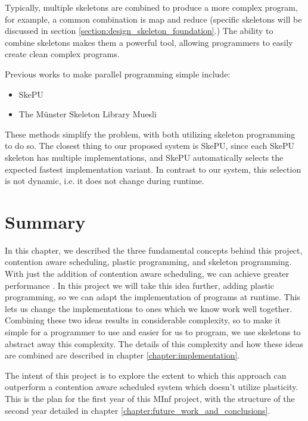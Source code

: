 Typically, multiple skeletons are combined to produce a more complex program, for example, a common combination is map and reduce (specific skeletons will be discussed in section \ref{section:design_skeleton_foundation}.) The ability to combine skeletons makes them a powerful tool, allowing programmers to easily create clean complex programs.

Previous works to make parallel programming simple include:

\begin{itemize}
	\item SkePU \cite{skepu}
	\item The M{\"u}nster Skeleton Library Muesli \cite{muesli}
\end{itemize}

These methods simplify the problem, with both utilizing skeleton programming to do so. The closest thing to our proposed system is SkePU, since each SkePU skeleton has multiple implementations, and SkePU automatically selects the expected fastest implementation variant. In contrast to our system, this selection is not dynamic, i.e. it does not change during runtime. 



\section{Summary}

In this chapter, we described the three fundamental concepts behind this project, contention aware scheduling, plastic programming, and skeleton programming. With just the addition of contention aware scheduling, we can achieve greater performance \cite{lira}. In this project we will take this idea further, adding plastic programming, so we can adapt the implementation of programs at runtime. This lets us change the implementations to ones which we know work well together. Combining these two ideas results in considerable complexity, so to make it simple for a programmer to use and easier for us to program, we use skeletons to abstract away this complexity. The details of this complexity and how these ideas are combined are described in chapter \ref{chapter:implementation}.

The intent of this project is to explore the extent to which this approach can outperform a contention aware scheduled system which doesn't utilize plasticity. This is the plan for the first year of this MInf project, with the structure of the second year detailed in chapter \ref{chapter:future_work_and_conclusions}.